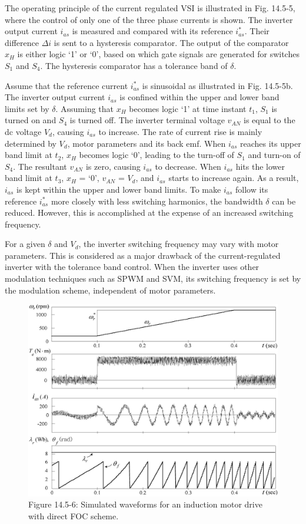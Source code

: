 \documentclass[letterpaper,12pt]{article}
\begin{document}
The operating principle of the current regulated VSI is illustrated in Fig. 14.5-5, where the control of only one of the three phase currents is shown. The inverter output current $i_{as}$ is measured and compared with its reference $i_{as}^*$. Their difference $\Delta i$ is sent to a hysteresis comparator. The output of the comparator $x_H$ is either logic ‘1’ or ‘0’, based on which gate signals are generated for switches $S_1$ and $S_4$. The hysteresis comparator has a tolerance band of $\delta$.

Assume that the reference current $i_{as}^*$ is sinusoidal as illustrated in Fig. 14.5-5b. The inverter output current $i_{as}$ is confined within the upper and lower band limits set by $\delta$. Assuming that $x_H$ becomes logic ‘1’ at time instant $t_1$, $S_1$ is turned on and $S_4$ is turned off. The inverter terminal voltage $v_{AN}$ is equal to the dc voltage $V_d$, causing $i_{as}$ to increase. The rate of current rise is mainly determined by $V_d$, motor parameters and its back emf. When $i_{as}$ reaches its upper band limit at $t_2$, $x_H$ becomes logic ‘0’, leading to the turn-off of $S_1$ and turn-on of $S_4$. The resultant $v_{AN}$ is zero, causing $i_{as}$ to decrease. When $i_{as}$ hits the lower band limit at $t_3$, $x_H$ = ‘0’, $v_{AN}$ = $V_d$, and $i_{as}$ starts to increase again. As a result, $i_{as}$ is kept within the upper and lower band limits. To make $i_{as}$ follow its reference $i_{as}^*$ more closely with less switching harmonics, the bandwidth $\delta$ can be reduced. However, this is accomplished at the expense of an increased switching frequency.

For a given $\delta$ and $V_d$, the inverter switching frequency may vary with motor parameters. This is considered as a major drawback of the current-regulated inverter with the tolerance band control. When the inverter uses other modulation techniques such as SPWM and SVM, its switching frequency is set by the modulation scheme, independent of motor parameters.

\begin{figure}[h]
\centering
\includegraphics[scale=0.8]{graficos/img18.jpg}
\caption{Figure 14.5-6: Simulated waveforms for an induction motor drive with direct FOC scheme.}
\end{figure}
\FloatBarrier
\end{document}
